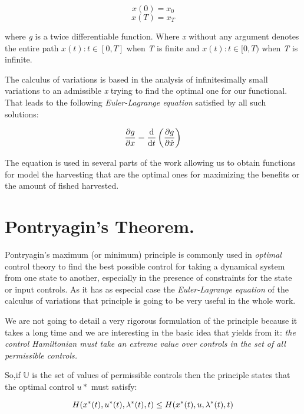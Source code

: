 $$x(0)=x_0$$
$$x(T)=x_T$$

where \textit{g} is a twice differentiable function. Where \textit{x} without any argument denotes the entire path ${x(t): t \in [0,T]}$ when \textit{T} is finite and ${x(t): t \in [0,T)}$ when \textit{T} is infinite. 

The calculus of variations is based in the analysis of infinitesimally small variations to an admissible \textit{x} trying to find the optimal one for our functional. That leads to the following \textit{Euler-Lagrange equation} satisfied by all such solutions:

\begin{equation}
\frac{\partial g}{{\partial x}} = \frac{\mathrm{d} }{{\mathrm{d} t}}\left(\frac{\partial g}{{\partial \dot{x}}}\right)
\end{equation}

The equation is used in several parts of the work allowing us to obtain functions for model the harvesting that are the optimal ones for maximizing the benefits or the amount of fished harvested.

\section{Pontryagin's Theorem.}
Pontryagin's maximum (or minimum) principle is commonly used in \textit{optimal} control theory to find the best possible control for taking a dynamical system from one state to another, especially in the presence of constraints for the state or input controls. As it has as especial case the \textit{Euler-Lagrange equation} of the calculus of variations that principle is going to be very useful in the whole work.

We are not going to detail a very rigorous formulation of the principle because it takes a long time and we are interesting in the basic idea that yields from it: \textit{the control Hamiltonian must take an extreme value over controls in the set of all permissible controls.}

So,if $\mathbb{U}$ is the set of values of permissible controls then the principle states that the optimal control $u*$ must satisfy:

$$H({x}^{\ast}(t),{u}^{\ast}(t),{\lambda}^{\ast}(t),t) \leq H({x}^{\ast}(t),u,{\lambda}^{\ast}(t),t)$$

